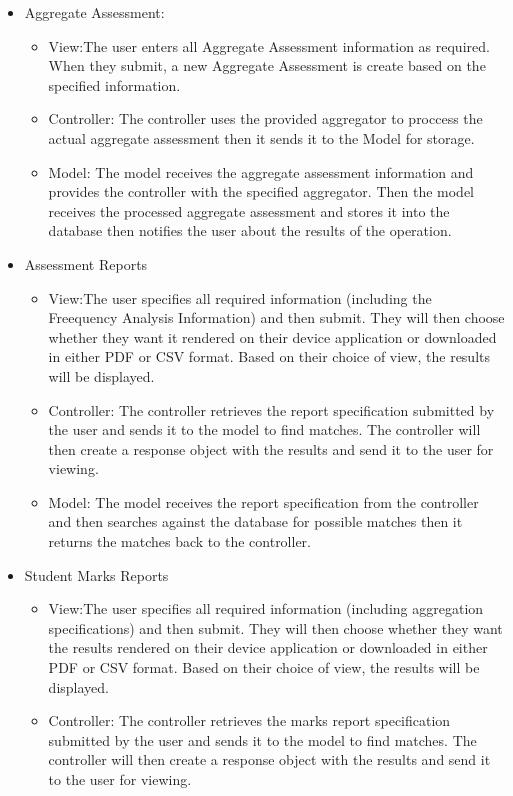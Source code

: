 \documentclass[12pt]{article}
\begin{document}
\begin{itemize}
\begin{itemize}
					\end{itemize}
					\item Aggregate Assessment:
						\begin{itemize}
							\item View:The user enters all Aggregate Assessment information as required. When they submit, a new Aggregate Assessment is create based on the specified information.
							\item Controller: The controller uses the provided aggregator to proccess the actual aggregate assessment then it sends it to the Model for storage.
							\item Model: The model receives the aggregate assessment information and provides the controller with the specified aggregator. Then the model receives the processed aggregate assessment and stores it into the database then notifies the user about the results of the operation.
						\end{itemize}
					\item Assessment Reports
						\begin{itemize}
							\item View:The user specifies all required information (including the Freequency Analysis Information) and then submit. They will then choose whether they want it rendered on their device application or downloaded in either PDF or CSV format. Based on their choice of view, the results will be displayed.
							\item Controller: The controller retrieves the report specification submitted by the user and sends it to the model to find matches. The controller will then create a response object with the results and send it to the user for viewing.
							\item Model: The model receives the report specification from the controller and then searches against the database for possible matches then it returns the matches back to the controller.
						\end{itemize}
					\item Student Marks Reports
						\begin{itemize}
							\item View:The user specifies all required information (including aggregation specifications) and then submit. They will then choose whether they want the results rendered on their device application or downloaded in either PDF or CSV format. Based on their choice of view, the results will be displayed.
							\item Controller: The controller retrieves the marks report specification submitted by the user and sends it to the model to find matches. The controller will then create a response object with the results and send it to the user for viewing.

\end{itemize}
\end{itemize}
\end{document}
